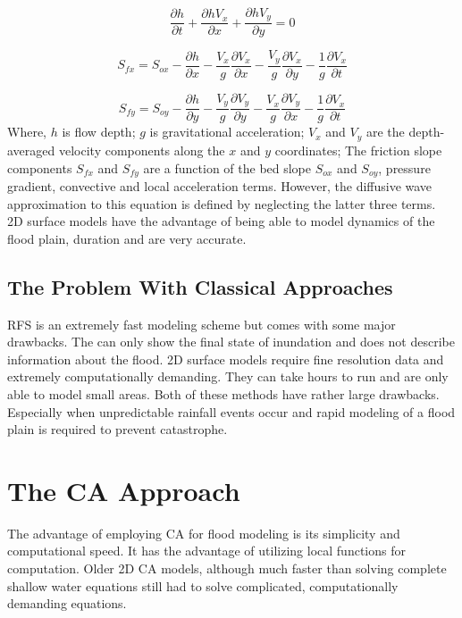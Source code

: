 \begin{equation}
	\label{eq:3.1}
	\frac{\partial h}{\partial t} + \frac{\partial h V_{x}}{\partial x} + \frac{\partial h V_{y}}{\partial y} = 0
\end{equation}

\begin{equation}
	\label{eq:3.2}
	S_{fx} = S_{ox} - \frac{\partial h}{\partial x} - \frac{V_{x}}{g}\frac{\partial V_{x}}{\partial x} - \frac{V_{y}}{g}\frac{\partial V_{x}}{\partial y} - \frac{1}{g}\frac{\partial V_{x}}{\partial t} 
\end{equation}

\begin{equation}
	\label{eq:3.3}
	S_{fy} = S_{oy} - \frac{\partial h}{\partial y} - \frac{V_{y}}{g}\frac{\partial V_{y}}{\partial y} - \frac{V_{x}}{g}\frac{\partial V_{y}}{\partial x} - \frac{1}{g}\frac{\partial V_{x}}{\partial t} 
\end{equation}
Where, $h$ is flow depth; $g$ is gravitational acceleration; $V_{x}$ and $V_{y}$ are the depth-averaged  velocity components along the $x$ and $y$ coordinates; The friction slope components $S_{fx}$ and $S_{fy}$ are a function of the bed slope $S_{ox}$ and $S_{oy}$, pressure gradient, convective and local acceleration terms. However, the diffusive wave approximation to this equation is defined by neglecting the latter three terms. \\
2D surface models have the advantage of being able to model dynamics of the flood plain, duration and are very accurate.
 
\subsection*{The Problem With Classical Approaches}
RFS is an extremely fast modeling scheme but comes with some major drawbacks. The can only show the final state of inundation and does not describe information about the flood. 2D surface models require fine resolution data and extremely computationally demanding. They can take hours to run and are only able to model small areas. Both of these methods have rather large drawbacks. Especially when unpredictable rainfall events occur and rapid modeling of a flood plain is required to prevent catastrophe.

\section{The CA Approach}
The advantage of employing CA for flood modeling is its simplicity \cite{Wolfram2002} and computational speed. It has the advantage of utilizing local functions for computation. Older 2D CA models, although much faster than solving complete shallow water equations still had to solve complicated, computationally demanding equations.
